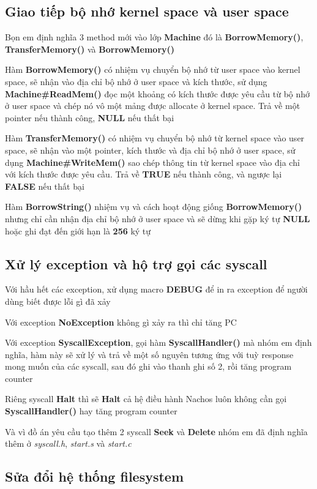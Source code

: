 \subsection{Giao tiếp bộ nhớ kernel space và user space}
Bọn em định nghĩa 3 method mới vào lớp \textbf{Machine} đó là \textbf{BorrowMemory()}, \textbf{TransferMemory()} và \textbf{BorrowMemory()}

Hàm \textbf{BorrowMemory()} có nhiệm vụ chuyển bộ nhớ từ user space vào kernel space, sẽ nhận vào địa chỉ bộ nhớ ở user space và kích thước, sử dụng \textbf{Machine\#ReadMem()} đọc một khoảng có kích thước được yêu cầu từ bộ nhớ ở user space và chép nó vô một mảng được allocate ở kernel space. Trả về một pointer nếu thành công, \textbf{NULL} nếu thất bại

Hàm \textbf{TransferMemory()} có nhiệm vụ chuyển bộ nhớ từ kernel space vào user space, sẽ nhận vào một pointer, kích thước và địa chỉ bộ nhớ ở user space, sử dụng \textbf{Machine\#WriteMem()} sao chép thông tin từ kernel space vào địa chỉ với kích thước được yêu cầu. Trả về \textbf{TRUE} nếu thành công, và ngược lại \textbf{FALSE} nếu thất bại

Hàm \textbf{BorrowString()} nhiệm vụ và cách hoạt động giống \textbf{BorrowMemory()} nhưng chỉ cần nhận địa chỉ bộ nhớ ở user space và sẽ dừng khi gặp ký tự \textbf{NULL} hoặc ghi đạt đến giới hạn là \textbf{256} ký tự

\subsection{Xử lý exception và hộ trợ gọi các syscall}
Với hầu hết các exception, xử dụng macro \textbf{DEBUG} để in ra exception để người dùng biết được lỗi gì đã xảy

Với exception \textbf{NoException} không gì xảy ra thì chỉ tăng PC

Với exception \textbf{SyscallException}, gọi hàm \textbf{SyscallHandler()} mà nhóm em định nghĩa, hàm này sẽ xử lý và trả về một số nguyên tương ứng với tuỳ response mong muốn của các syscall, sau đó ghi vào thanh ghi số 2, rồi tăng program counter

Riêng syscall \textbf{Halt} thì sẽ \textbf{Halt} cả hệ điều hành Nachos luôn không cần gọi \textbf{SyscallHandler()} hay tăng program counter

Và vì đồ án yêu cầu tạo thêm 2 syscall \textbf{Seek} và \textbf{Delete} nhóm em đã định nghĩa thêm ở \textit{syscall.h}, \textit{start.s} và \textit{start.c}

\subsection{Sửa đổi hệ thống filesystem}
